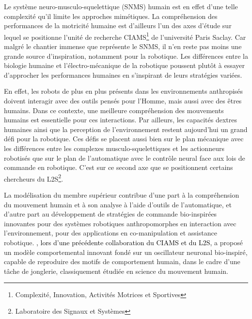 Le système neuro-musculo-squelettique (SNMS) humain est en effet d'une telle complexité qu'il limite les approches mimétiques. La compréhension des performances de la motricité humaine est d'ailleurs l'un des axes d'étude sur lequel se positionne l'unité de recherche CIAMS\footnote{Complexité, Innovation, Activités Motrices et Sportives} de l'université Paris Saclay. Car malgré le chantier immense que représente le SNMS, il n'en reste pas moins une grande source d'inspiration, notamment pour la robotique. Les différences entre la biologie humaine et l'électro-mécanique de la robotique poussent plutôt à essayer d'approcher les performances humaines en s'inspirant de leurs stratégies variées.

%
En effet, les robots de plus en plus présents dans les environnements anthropisés doivent interagir avec des outils pensés pour l'Homme, mais aussi avec des êtres humains. Dans ce contexte, une meilleure compréhension des mouvements humains est essentielle pour ces interactions. Par ailleurs, les capacités dextres humaines ainsi que la perception de l'environnement restent aujourd'hui un grand défi pour la robotique. Ces défis se placent aussi bien sur le plan mécanique avec les différences entre les complexes musculo-squelettiques et les actionneurs robotisés que sur le plan de l'automatique avec le contrôle neural face aux lois de commande en robotique. C'est sur ce second axe que se positionnent certains chercheurs du L2S\footnote{Laboratoire des Signaux et Systèmes}.

%
La modélisation du membre supérieur contribue d’une part à la compréhension du mouvement humain et à son analyse à l’aide d’outils de l’automatique, et d’autre part au développement de stratégies de commande bio-inspirées innovantes pour des systèmes robotiques anthropomorphes en interaction avec l’environnement, pour des applications en co-manipulation et assistance robotique. \textcite{avrin_modelisation_2017}\textcolor{black}{, lors d'une précédente collaboration du CIAMS et du L2S,} a proposé un modèle comportemental innovant fondé sur un oscillateur neuronal bio-inspiré, capable de reproduire des motifs de comportement humain, dans le cadre d'une tâche de jonglerie, classiquement étudiée en science du mouvement humain. %


